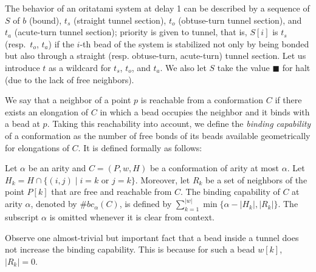 The behavior of an oritatami system at delay 1 can be described by a sequence of $S$ of $b$ (bound), $t_s$ (straight tunnel section), $t_o$ (obtuse-turn tunnel section), and $t_a$ (acute-turn tunnel section); priority is given to tunnel, that is, $S[i]$ is $t_s$ (resp.~$t_o$, $t_a$) if the $i$-th bead of the system is stabilized not only by being bonded but also through a straight (resp. obtuse-turn, acute-turn) tunnel section. 
Let us introduce $t$ as a wildcard for $t_s$, $t_o$, and $t_a$. 
We also let $S$ take the value $\blacksquare$ for halt (due to the lack of free neighbors). 


We say that a neighbor of a point $p$ is reachable from a conformation $C$ if there exists an elongation of $C$ in which a bead occupies the neighbor and it binds with a bead at $p$. 
Taking this reachability into account, we define the \textit{binding capability} of a conformation as the number of free bonds of its beads available geometrically for elongations of $C$.
It is defined formally as follows: 

\begin{definition}
Let $\alpha$ be an arity and $C = (P,w,H)$ be a conformation of arity at most $\alpha$.
Let $H_k = H \cap \{ (i,j) \mid \mbox{$i=k$ or $j=k$} \}$. 
Moreover, let $R_k$ be a set of neighbors of the point $P[k]$ that are free and reachable from $C$.
The binding capability of $C$ at arity $\alpha$, denoted by $\#bc_\alpha(C)$, is defined by $\sum^{|w|}_{k=1} \min \{\alpha-|H_k|, |R_k|\}$.
The subscript $\alpha$ is omitted whenever it is clear from context. 
\end{definition}
%
Observe one almost-trivial but important fact that a bead inside a tunnel does not increase the binding capability. 
This is because for such a bead $w[k]$, $|R_k| = 0$. 

